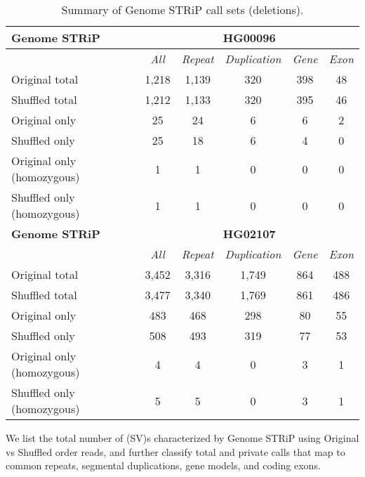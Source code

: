 \begin{table}[htb]
\caption{ Summary of Genome STRiP call sets (deletions). }
\begin{center}
\begin{tabular}{|l|c||c|c|c|c|}
\hline
{\bf Genome STRiP} & \multicolumn{5}{|c|}{\bf HG00096} \\
\hline
\cline{2-6}
{\bf} & {\it All} & {\it Repeat} & {\it Duplication} & {\it Gene} & {\it Exon} \\
\hline
Original total & 1,218 & 1,139 & 320 & 398 & 48 \\
\hline
Shuffled total & 1,212 & 1,133 & 320 & 395 & 46 \\
\hline
Original only & 25 & 24 & 6 & 6 & 2\\ 
\hline
Shuffled only & 25 & 18 & 6 & 4 & 0\\
\hline
Original only (homozygous) & 1 & 1 & 0 & 0 & 0\\ 
\hline
Shuffled only (homozygous) & 1 & 1 & 0 & 0 & 0\\  
\hline
\hline
{\bf Genome STRiP} & \multicolumn{5}{|c|}{\bf HG02107} \\
\hline
\cline{2-6}
{\bf} & {\it All} & {\it Repeat} & {\it Duplication} & {\it Gene} & {\it Exon} \\
\hline
Original total & 3,452 & 3,316 & 1,749 & 864 & 488 \\
\hline
Shuffled total & 3,477 & 3,340 & 1,769 & 861 & 486 \\
\hline
Original only & 483 & 468 & 298 & 80 & 55\\ 
\hline
Shuffled only & 508 & 493 & 319 & 77 & 53\\
\hline
Original only (homozygous) & 4 & 4 & 0 & 3 & 1\\ 
\hline
Shuffled only (homozygous) & 5 & 5 & 0 & 3 & 1\\  
\hline
\end{tabular}
\end{center}
{\footnotesize We list the total number of (SV)s characterized by Genome STRiP using Original vs Shuffled order reads, 
and further classify total and private calls that map to common repeats, segmental duplications, gene models, and coding exons.}
\label{supptab:orig-vs-shuf-svtoolkit}
\end{table}

